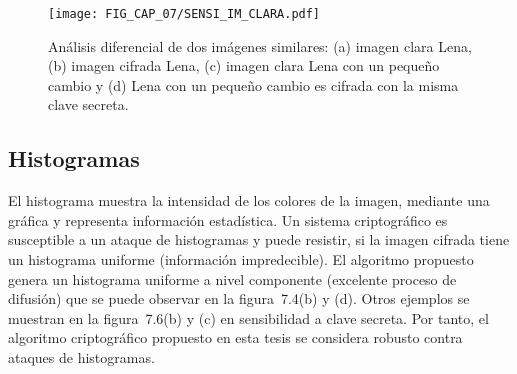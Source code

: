\begin{figure}[!htbp] %
	\center
	\texttt{[image: FIG\_CAP\_07/SENSI\_IM\_CLARA.pdf]}      	 
	\caption{Análisis diferencial de dos imágenes similares: (a) imagen clara Lena, (b) imagen cifrada Lena, (c) imagen clara Lena con un pequeño cambio y (d) Lena con un pequeño cambio es cifrada con la misma clave secreta.}
\end{figure}

\begin{table}[!htbp] %
	\center
	\caption{Resultados de $NPCR$ y $UACI$ con el algoritmo propuesto.}
\end{table}

\begin{table}[!htbp] %
	\center 
	\caption{Comparación de análisis diferencial con otros algoritmos reportados en la literatura.}
\end{table}

\subsection{Histogramas}
El histograma muestra la intensidad de los colores de la imagen, mediante una gráfica y representa información estadística. Un sistema criptográfico es susceptible a un ataque de histogramas y puede resistir, si la imagen cifrada tiene un histograma uniforme (información impredecible). El algoritmo propuesto genera un histograma uniforme a nivel componente (excelente proceso de difusión) que se puede observar en la figura~7.4(b) y (d). Otros ejemplos se muestran en la figura~7.6(b) y (c) en sensibilidad a clave secreta. Por tanto, el algoritmo criptográfico propuesto en esta tesis se considera robusto contra ataques de histogramas. 

